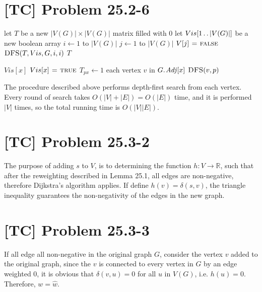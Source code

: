 \documentclass[a4paper,11pt,twocolumn]{article}
\newcommand{\FALSE}{\const{false}}
\newcommand{\TRUE}{\const{true}}
\begin{document}
  \section{[TC] Problem 25.2-6}
   \begin{codebox}
    \li let $T$ be a new $|V(G)| \times |V(G)|$ matrix filled with 0
    \li let $Vis[1 \mathinner{\ldotp\ldotp} |V(G)|]$ be a new boolean array
    \li \For $i \gets 1$ to $|V(G)|$
    \li \Do  \For $j \gets 1$ to $|V(G)|$
    \li      \Do  $V[j] \gets \FALSE$
             \End
    \li      $\textnormal{\scshape DFS}(T, Vis, G, i, i)$
        \End
    \li \Return $T$
  \end{codebox}
  \begin{codebox}
    \li \If $Vis[x]$
    \li \Do \Return
        \End
    \li $Vis[x] \gets \TRUE$
    \li $T_{px} \gets 1$
    \li \For each vertex $v$ in $\attrib{G}{Adj}[x]$
    \li \Do  $\textnormal{\scshape DFS}(v, p)$
        \End
  \end{codebox}
  The procedure described above performs depth-first search from each vertex. Every round of search takes $O(|V|+|E|) = O(|E|)$ time, and it is performed $|V|$ times, so the total running time is $O(|V||E|)$.

  \section{[TC] Problem 25.3-2}
  The purpose of adding $s$ to $V$, is to determining the  function $h : V \rightarrow \mathbb{R}$, such that after the reweighting described in Lemma 25.1, all edges are non-negative, therefore Dijkstra's algorithm applies. If define $h(v) = \delta(s, v)$, the triangle inequality guarantees the non-negativity of the edges in the new graph.

  \section{[TC] Problem 25.3-3}
  If all edge all non-negative in the original graph $G$, consider the vertex $v$ added to the original graph, since the $v$ is connected to every vertex in $G$ by an edge weighted 0, it is obvious that $\delta(v, u) = 0$ for all $u$ in $V(G)$, i.e. $h(u) = 0$. Therefore, $w = \hat{w}$.
\end{document}

